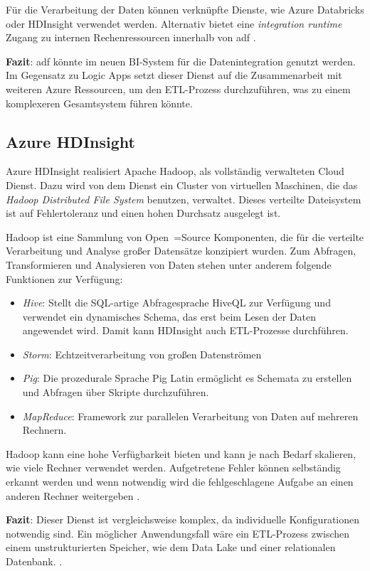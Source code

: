 Für die Verarbeitung der Daten können verknüpfte Dienste, wie Azure Databricks oder HDInsight verwendet werden. Alternativ bietet eine \textit{integration runtime} Zugang zu internen Rechenressourcen innerhalb von \ac{adf} \cite{swinbank_your_2021}.

\textbf{Fazit}: \ac{adf} könnte im neuen BI-System für die Datenintegration genutzt werden. Im Gegensatz zu Logic Apps setzt dieser Dienst auf die Zusammenarbeit mit weiteren Azure Ressourcen, um den ETL-Prozess durchzuführen, was zu einem komplexeren Gesamtsystem führen könnte.

\subsection{Azure HDInsight} \label{sec:grundlagen:azure_dienste:hdInsight}
Azure HDInsight realisiert Apache Hadoop, als vollständig verwalteten Cloud Dienst. Dazu wird von dem Dienst ein Cluster von virtuellen Maschinen, die das \textit{Hadoop Distributed File System} benutzen, verwaltet. Dieses verteilte Dateisystem ist auf Fehlertoleranz und einen hohen Durchsatz ausgelegt ist.

Hadoop ist eine Sammlung von Open~=Source Komponenten, die für die verteilte Verarbeitung und Analyse großer Datensätze konzipiert wurden. Zum Abfragen, Transformieren und Analysieren von Daten stehen unter anderem folgende Funktionen zur Verfügung:
\begin{itemize}
\item \textit{Hive}: Stellt die SQL-artige Abfragesprache HiveQL zur Verfügung und verwendet ein dynamisches Schema, das erst beim Lesen der Daten angewendet wird. Damit kann HDInsight auch ETL-Prozesse durchführen.
\item \textit{Storm}: Echtzeitverarbeitung von großen Datenströmen 
\item \textit{Pig}: Die prozedurale Sprache Pig Latin ermöglicht es Schemata zu erstellen und Abfragen über Skripte durchzuführen.
\item \textit{MapReduce}: Framework zur parallelen Verarbeitung von Daten auf mehreren Rechnern.
\end{itemize}

Hadoop kann eine hohe Verfügbarkeit bieten und kann je nach Bedarf skalieren, wie viele Rechner verwendet werden. Aufgetretene Fehler können selbständig erkannt werden und wenn notwendig wird die fehlgeschlagene Aufgabe an einen anderen Rechner weitergeben \cite{klein_iot_2017}.

\textbf{Fazit}: Dieser Dienst ist vergleichsweise komplex, da individuelle Konfigurationen notwendig sind. Ein möglicher Anwendungsfall wäre ein ETL-Prozess zwischen einem unstrukturierten Speicher, wie dem Data Lake und einer relationalen Datenbank. \cite[vgl.][]{klein_iot_2017}.


